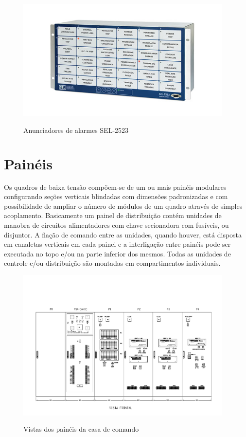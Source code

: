 \documentclass[a5paper,english,spanish,brazil]{ufsc-thesis}
\begin{document}
\begin{figure}[htb]
  \caption{Anunciadores de alarmes SEL-2523}
  \centering
  \includegraphics[width=10.8cm]{anunciador.jpg}
  \label{fig:anunciador}
\end{figure}

\section{Painéis}
Os quadros de baixa tensão compõem-se de um ou mais painéis modulares configurando seções verticais blindadas com dimensões padronizadas e com possibilidade de ampliar o número de módulos de um quadro através de simples acoplamento. Basicamente um painel de distribuição contém unidades de manobra de circuitos alimentadores com chave secionadora com fusíveis, ou disjuntor. A fiação de comando entre as unidades, quando houver, está disposta em canaletas verticais em cada painel e a interligação entre painéis pode ser executada no topo e/ou na parte inferior dos mesmos. Todas as unidades de controle e/ou distribuição são montadas em compartimentos individuais.

\begin{figure}[htb]
  \caption{Vistas dos painéis da casa de comando}
  \centering
  \includegraphics[width=10.8cm]{paineis.pdf}
  \label{fig:paineis}
\end{figure}
\end{document}
